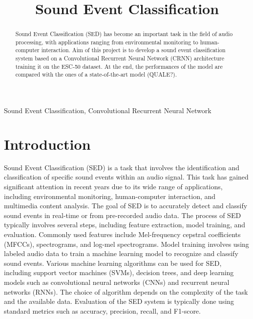 \documentclass{article}
\title{Sound Event Classification}
\begin{document}
\ninept
\maketitle

\begin{sloppy}

\begin{abstract}
  Sound Event Classification (SED) has become an important task in the field of
  audio processing, with applications ranging from environmental monitoring to
  human-computer interaction. Aim of this project is to develop a sound event classification system
  based on a Convolutional Recurrent Neural Network (CRNN) architecture training it on the ESC-50 dataset.
  At the end, the performances of the model are compared with the ones of a state-of-the-art model (QUALE?).
\end{abstract}

\begin{keywords}
Sound Event Classification, Convolutional Recurrent Neural Network
\end{keywords}

\section{Introduction}
\label{sec:intro}
Sound Event Classification (SED) is a task that involves the identification and classification of
specific sound events within an audio signal. This task has gained significant attention in recent years
due to its wide range of applications, including environmental monitoring\cite{birdsCNN2017}, human-computer interaction\cite{emotionRecognition2021}, and multimedia content analysis\cite{kumar2016weaklysupervisedscalableaudio}.
The goal of SED is to accurately detect and classify sound events in real-time or from pre-recorded audio data.
The process of SED typically involves several steps, including feature extraction, model training, and evaluation\cite{ReviewSoundEvent2025}.
Commonly used features include Mel-frequency cepstral coefficients (MFCCs), spectrograms, and log-mel spectrograms.
Model training involves using labeled audio data to train a machine learning model to recognize and classify sound events.
Various machine learning algorithms can be used for SED, including support vector machines (SVMs), decision trees, and deep
learning models such as convolutional neural networks (CNNs) and recurrent neural networks (RNNs)\cite{DescriptiveESC2022}.
The choice of algorithm depends on the complexity of the task and the available data.
Evaluation of the SED system is typically done using standard metrics such as accuracy, precision, recall, and F1-score.


\end{sloppy}
\end{document}

